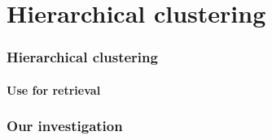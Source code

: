 \documentclass[../tech_report_1.tex]{subfiles}
\begin{document}
\part*{Hierarchical clustering}

\section*{Hierarchical clustering}

\subsection*{Use for retrieval}

\section*{Our investigation}
\end{document}
